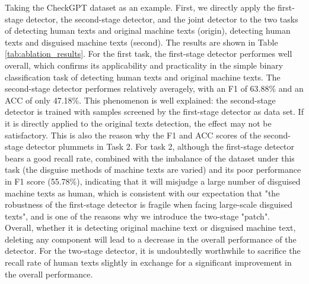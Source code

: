 \documentclass[11pt]{article}
\begin{document}
		Taking the CheckGPT dataset as an example. First, we directly apply the first-stage detector, the second-stage detector, and the joint detector to the two tasks of detecting human texts and original machine texts (origin), detecting human texts and disguised machine texts (second). The results are shown in Table \ref{tab:ablation_results}. For the first task, the first-stage detector performes well overall, which confirms its applicability and practicality in the simple binary classification task of detecting human texts and original machine texts. The second-stage detector performes relatively averagely, with an F1 of 63.88\% and an ACC of only 47.18\%. This phenomenon is well explained: the second-stage detector is trained with samples screened by the first-stage detector as data set. If it is directly applied to the original texts detection, the effect may not be satisfactory. This is also the reason why the F1 and ACC scores of the second-stage detector plummets in Task 2. For task 2, although the first-stage detector bears a good recall rate, combined with the imbalance of the dataset under this task (the disguise methods of machine texts are varied) and its poor performance in F1 score (55.78\%), indicating that it will misjudge a large number of disguised machine texts as human, which is consistent with our expectation that "the robustness of the first-stage detector is fragile when facing large-scale disguised texts", and is one of the reasons why we introduce the two-stage "patch".\\
		Overall, whether it is detecting original machine text or disguised machine text, deleting any component will lead to a decrease in the overall performance of the detector. For the two-stage detector, it is undoubtedly worthwhile to sacrifice the recall rate of human texts slightly in exchange for a significant improvement in the overall performance.
\end{document}
